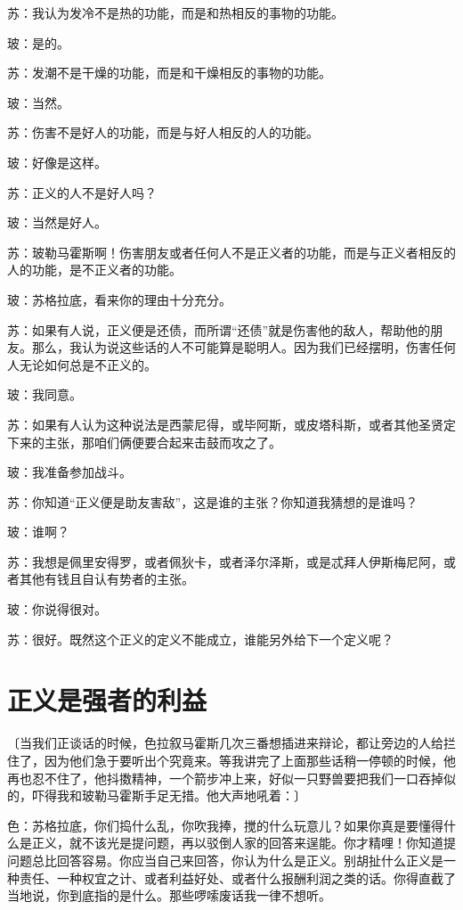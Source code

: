\documentclass[11pt,oneside]{book}
\begin{document}
\begin{common-format}
苏：我认为发冷不是热的功能，而是和热相反的事物的功能。

玻：是的。

苏：发潮不是干燥的功能，而是和干燥相反的事物的功能。

玻：当然。

苏：伤害不是好人的功能，而是与好人相反的人的功能。

玻：好像是这样。

苏：正义的人不是好人吗？

玻：当然是好人。

苏：玻勒马霍斯啊！伤害朋友或者任何人不是正义者的功能，而是与正义者相反的人的功能，是不正义者的功能。

玻：苏格拉底，看来你的理由十分充分。

苏：如果有人说，正义便是还债，而所谓“还债”就是伤害他的敌人，帮助他的朋友。那么，我认为说这些话的人不可能算是聪明人。因为我们已经摆明，伤害任何人无论如何总是不正义的。

玻：我同意。

苏：如果有人认为这种说法是西蒙尼得，或毕阿斯，或皮塔科斯，或者其他圣贤定下来的主张，那咱们俩便要合起来击鼓而攻之了。

玻：我准备参加战斗。

苏：你知道“正义便是助友害敌”，这是谁的主张？你知道我猜想的是谁吗？

玻：谁啊？

苏：我想是佩里安得罗，或者佩狄卡，或者泽尔泽斯，或是忒拜人伊斯梅尼阿，或者其他有钱且自认有势者的主张。

玻：你说得很对。

苏：很好。既然这个正义的定义不能成立，谁能另外给下一个定义呢？


\section{正义是强者的利益}
〔当我们正谈话的时候，色拉叙马霍斯几次三番想插进来辩论，都让旁边的人给拦住了，因为他们急于要听出个究竟来。等我讲完了上面那些话稍一停顿的时候，他再也忍不住了，他抖擞精神，一个箭步冲上来，好似一只野兽要把我们一口吞掉似的，吓得我和玻勒马霍斯手足无措。他大声地吼着：〕

色：苏格拉底，你们捣什么乱，你吹我捧，搅的什么玩意儿？如果你真是要懂得什么是正义，就不该光是提问题，再以驳倒人家的回答来逞能。你才精哩！你知道提问题总比回答容易。你应当自己来回答，你认为什么是正义。别胡扯什么正义是一种责任、一种权宜之计、或者利益好处、或者什么报酬利润之类的话。你得直截了当地说，你到底指的是什么。那些啰嗦废话我一律不想听。


\end{common-format}
\end{document}
